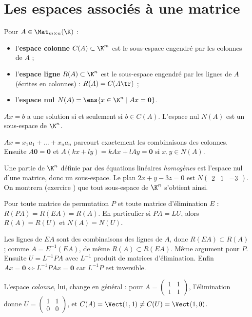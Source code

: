 \section{Les espaces associés à une matrice}
\begin{definition}
Pour $A\in\Mat_{m\times n}(\K)$ :
\begin{itemize}
\item l'\textbf{espace colonne} $C(A)\subset\K^m$ est le sous-espace engendré par les colonnes de $A$ ;
\item l'\textbf{espace ligne} $R(A)\subset\K^n$ est le sous-espace engendré par les lignes de $A$ (écrites en colonnes) : $R(A)=C(A\tr)$ ;
\item l'\textbf{espace nul} $N(A)=\ens{x\in\K^n\mid Ax=\mathbf 0}$.
\end{itemize}
\end{definition}
\begin{proposition}\label{prop-CA}
$Ax=b$ a une solution si et seulement si $b\in C(A)$. L'espace nul $N(A)$ est un sous-espace de $\K^n$.
\end{proposition}
\begin{preuve}
$Ax=x_1a_1+\dots+x_na_n$ parcourt exactement les combinaisons des colonnes. Ensuite $A\mathbf 0=\mathbf 0$ et $A(kx+ly)=kAx+lAy=\mathbf 0$ si $x,y\in N(A)$.
\end{preuve}
\begin{methode}
Une partie de $\K^n$ définie par des équations linéaires \emph{homogènes} est l'espace nul d'une matrice, donc un sous-espace. Le plan $2x+y-3z=0$ est $N\begin{pmatrix}2&1&-3\end{pmatrix}$. On montrera (exercice ) que tout sous-espace de $\K^n$ s'obtient ainsi.
\end{methode}
\begin{theoreme}\label{thm-espace-ligne}
Pour toute matrice de permutation $P$ et toute matrice d'élimination $E$ : $R(PA)=R(EA)=R(A)$. En particulier si $PA=LU$, alors $R(A)=R(U)$ et $N(A)=N(U)$.
\end{theoreme}
\begin{preuve}
Les lignes de $EA$ sont des combinaisons des lignes de $A$, donc $R(EA)\subset R(A)$ ; comme $A=E^{-1}(EA)$, de même $R(A)\subset R(EA)$. Même argument pour $P$. Ensuite $U=L^{-1}PA$ avec $L^{-1}$ produit de matrices d'élimination. Enfin $Ax=\mathbf 0\iff L^{-1}PAx=\mathbf 0$ car $L^{-1}P$ est inversible.
\end{preuve}
\begin{attention}
L'espace \emph{colonne}, lui, change en général : pour $A=\begin{pmatrix}1&1\\1&1\end{pmatrix}$, l'élimination donne $U=\begin{pmatrix}1&1\\0&0\end{pmatrix}$, et $C(A)=\Vect(1,1)\neq C(U)=\Vect(1,0)$.
\end{attention}


